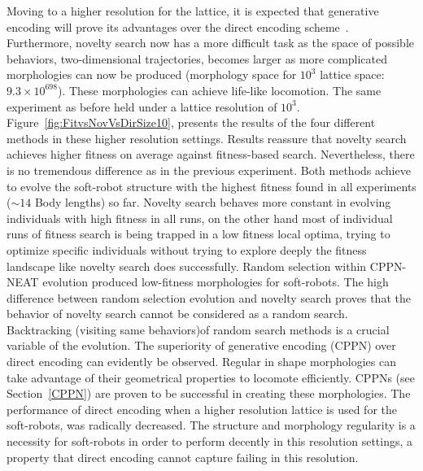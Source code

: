 Moving to a higher resolution for the lattice, it is expected that generative encoding will prove its advantages over the direct encoding scheme~\citep{cheney2013unshackling,stanley2007compositional}. Furthermore, novelty search now has a more difficult task as the space of possible behaviors, two-dimensional trajectories, becomes larger as more complicated morphologies can now be produced (morphology space for $10^3$ lattice space: $9.3 \times 10^{698}$). These morphologies can achieve life-like locomotion. The same experiment as before held under a lattice resolution of $10^3$. Figure~\ref{fig:FitvsNovVsDirSize10}, presents the results of the four different methods in these higher resolution settings. Results reassure that novelty search achieves higher fitness on average against fitness-based search. Nevertheless, there is no tremendous difference as in the previous experiment. Both methods achieve to evolve the soft-robot structure with the highest fitness found in all experiments ($\sim 14$ Body lengths) so far. Novelty search behaves more constant in evolving individuals with high fitness in all runs, on the other hand most of individual runs of fitness search is being trapped in a low fitness local optima, trying to optimize specific individuals without trying to explore deeply the fitness landscape like novelty search does successfully. Random selection within CPPN-NEAT evolution produced low-fitness morphologies for soft-robots. The high difference between random selection evolution and novelty search proves that the behavior of novelty search cannot be considered as a random search. Backtracking (visiting same behaviors)of random search methods is a crucial variable of the evolution. The superiority of generative encoding (CPPN) over direct encoding can evidently be observed. Regular in shape morphologies can take advantage of their geometrical properties to locomote efficiently. CPPNs (see Section~\ref{CPPN}) are proven to be successful in creating these morphologies. The performance of direct encoding when a higher resolution lattice is used for the soft-robots, was radically decreased. The structure and morphology regularity is a necessity for soft-robots in order to perform decently in this resolution settings, a property that direct encoding cannot capture failing in this resolution.

